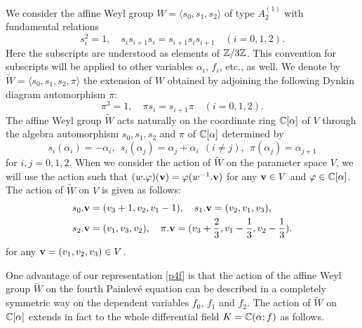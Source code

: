 We consider the affine Weyl group 
$W=\langle s_0, s_1,s_2\rangle$
of type $A^{(1)}_2$ with fundamental relations
\begin{equation}
s_i^2=1,\quad s_i s_{i+1} s_i = s_{i+1} s_i s_{i+1}\quad (i=0,1,2). 
\end{equation}
Here the subscripts are understood as elements of ${\Bbb Z}/3{\Bbb Z}$.  
This convention for subscripts will be applied 
to other variables $\alpha_i$, $f_i$, etc., as well. 
We denote by $\widetilde{W}=\langle s_0,s_1,s_2,\pi \rangle$ 
the extension of $W$  obtained by adjoining the following Dynkin diagram 
automorphism $\pi$:  
\begin{equation}
\pi^3=1,\quad \pi s_i=s_{i+1}\pi \quad(i=0,1,2). 
\end{equation} 
The affine Weyl group $\widetilde{W}$ acts naturally on the coordinate ring 
${\Bbb C}[\alpha]$ of $V$ through the algebra automorphism 
$s_0,s_1,s_2$ and $\pi$ of ${\Bbb C}[\alpha]$ determined by 
\begin{equation}
s_i(\alpha_i)=-\alpha_i,\ \ 
s_i(\alpha_j)=\alpha_j+\alpha_i\ \ (i\ne j), \ \ \pi(\alpha_j)=\alpha_{j+1}
\end{equation}
for $i,j=0,1,2$. 
When we consider the action of $\widetilde{W}$ on the parameter space $V$, 
we will use the action such that $(w.\varphi)(\mbox{\bf v})=\varphi(w^{-1}.\mbox{\bf v})$ 
for any $\mbox{\bf v}\in V$ and $\varphi\in {\Bbb C}[\alpha]$.  
The action of $\widetilde{W}$ on $V$ is given as follows: 
\begin{equation} 
\begin{align}
& s_0.\mbox{\bf v}=(v_3+1,v_2,v_1-1),\quad
s_1.\mbox{\bf v}=(v_2,v_1,v_3),\\ 
&s_2.\mbox{\bf v}=(v_1,v_3,v_2),\quad
\pi.\mbox{\bf v}=(v_3+\frac{2}{3},v_1-\frac{1}{3},v_2-\frac{1}{3}).\notag
\end{align}
\end{equation}
for any $\mbox{\bf v}=(v_1,v_2,v_3)\in V$.
\par\medskip
One advantage of our representation \eqref{p4f} is that the 
action of the affine Weyl group $\widetilde{W}$ on the fourth Painlev\'e 
equation can be described in a completely symmetric way 
on the dependent variables $f_0$, $f_1$ and $f_2$. 
The action of $\widetilde{W}$ on ${\Bbb C}[\alpha]$ extends in fact to 
the whole differential field $K={\Bbb C}(\alpha;f)$  as follows.

